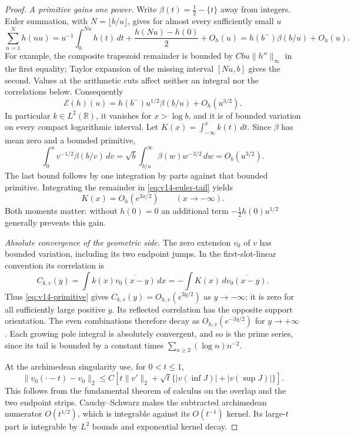 \documentclass[11pt]{article}
\theoremstyle{remark}
\begin{document}
\begin{proof}
\emph{A primitive gains one power.}
Write $\beta(t)=\tfrac12-\{t\}$ away from integers. Euler summation,
with $N=\lfloor b/u\rfloor$, gives for almost every sufficiently small $u$
\[
 \sum_{n=1}^N h(nu)
 =u^{-1}\int_0^{Nu}h(t)\,dt+
       \frac{h(Nu)-h(0)}2+O_h(u)
 =h(b^-)\beta(b/u)+O_h(u).
\]
For example, the composite trapezoid remainder is bounded by
$Cbu\|h''\|_\infty$ in the first equality; Taylor expansion of the
missing interval $[Nu,b]$ gives the second. Values at the arithmetic
cuts affect neither an integral nor the correlations below. Consequently
\begin{equation}\label{eq:v14-euler-tail}
 \mathcal E(h)(u)
 =h(b^-)u^{1/2}\beta(b/u)+O_h(u^{3/2}).
\end{equation}
In particular $k\in L^2(\mathbb R)$, it vanishes for $x>\log b$, and
it is of bounded variation on every compact logarithmic interval.
Let $K(x)=\int_{-\infty}^x k(t)\,dt$. Since $\beta$ has mean zero
and a bounded primitive,
\[
 \int_0^u v^{-1/2}\beta(b/v)\,dv
 =\sqrt b\int_{b/u}^{\infty}\beta(w)w^{-3/2}\,dw
 =O_b(u^{3/2}).
\]
The last bound follows by one integration by parts against that bounded
primitive. Integrating the remainder in \eqref{eq:v14-euler-tail} yields
\begin{equation}\label{eq:v14-primitive}
 K(x)=O_h(e^{3x/2})\qquad(x\longrightarrow-\infty).
\end{equation}
Both moments matter: without $h(0)=0$ an additional term
$-\tfrac12h(0)u^{1/2}$ generally prevents this gain.

\emph{Absolute convergence of the geometric side.}
The zero extension $v_0$ of $v$ has bounded variation, including its two
endpoint jumps. In the first-slot-linear convention its correlation is
\[
 C_{k,v}(y)=\int k(x)\overline{v_0(x-y)}\,dx
          =-\int K(x)\,d\overline{v_0(x-y)}.
\]
Thus \eqref{eq:v14-primitive} gives
$C_{k,v}(y)=O_{h,v}(e^{3y/2})$ as $y\to-\infty$; it is zero for
all sufficiently large positive $y$. Its reflected correlation has the
opposite support orientation. The even combinations therefore decay as
$O_{h,v}(e^{-3y/2})$ for $y\to+\infty$. Each growing pole integral
is absolutely convergent, and so is the prime series, since its tail is
bounded by a constant times $\sum_{n\ge2}(\log n)n^{-2}$.

At the archimedean singularity use, for $0<t\le1$,
\begin{equation}\label{eq:v14-translation}
 \|v_0(\cdot-t)-v_0\|_2
 \le C\left[t\|v'\|_2+
       \sqrt t\{|v(\inf J)|+|v(\sup J)|\}\right].
\end{equation}
This follows from the fundamental theorem of calculus on the overlap
and the two endpoint strips. Cauchy--Schwarz makes the subtracted
archimedean numerator $O(t^{1/2})$, which is integrable against its
$O(t^{-1})$ kernel. Its large-$t$ part is integrable by $L^2$ bounds
and exponential kernel decay.


\end{proof}
\end{document}

